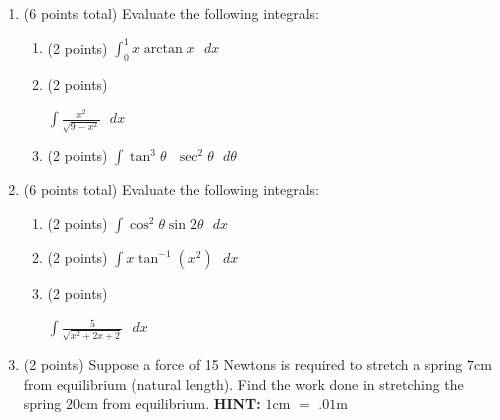 \documentclass[paper=a4, fontsize=11pt]{scrartcl} %
\numberwithin{equation}{section} %
\numberwithin{figure}{section} %
\numberwithin{table}{section} %
\begin{document}
\begin{enumerate}
\setlength{\itemsep}{0.45in}
\item (6 points total) Evaluate the following integrals: 
\begin{enumerate}
\item (2 points) $\int_0^1 x \arctan x  \text {  } dx$
\vspace{2.5in}
\item (2 points) \begin{large}$\int \frac{x^{2}}{\sqrt{9-x^2}} \text {  } dx$\end{large}
\vspace{2.5in}
\item (2 points) $\int \tan^3 \theta \text { }  \sec^2 \theta \text {  } d \theta$
\end{enumerate}

\newpage

\item (6 points total) Evaluate the following integrals: 
\begin{enumerate}
\item (2 points) $\int \cos^2 \theta \sin 2 \theta \text {  } dx$
\vspace{2.5in}
\item (2 points) $\int x \tan^{-1} (x^2) \text {  } dx$
\vspace{2.5in}
\item (2 points) \begin{large}$\int \frac{5}{\sqrt{x^2+2x+2}} \text {  } dx$\end{large}
\end{enumerate}

\newpage

\item (2 points) Suppose a force of 15 Newtons is required to stretch a spring $7$cm from equilibrium (natural length).  Find the work done in stretching the spring $20$cm from equilibrium. \textbf{HINT:} $1$cm $=$ $.01$m 

\vspace{3in}


\end{enumerate}
\end{document}
